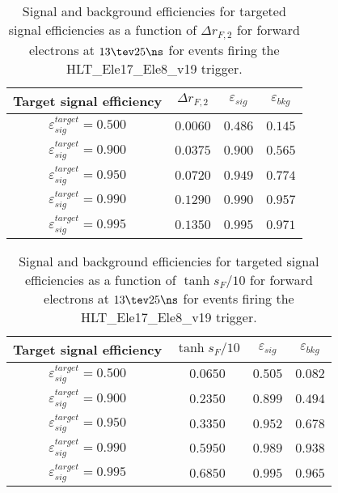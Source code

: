 \clearpage

\begin{table}[!bht]
  \begin{center}
    \begin{tabular}{cccc}
      \hline
      Target signal efficiency & $\Delta r_{F,2}$ & $\varepsilon_{sig}$ & $\varepsilon_{bkg}$ \\ 
      \hline
      $\varepsilon_{sig}^{target} = 0.500$ & $  0.0060$ & $0.486$ & $0.145$ \\
      $\varepsilon_{sig}^{target} = 0.900$ & $  0.0375$ & $0.900$ & $0.565$ \\
      $\varepsilon_{sig}^{target} = 0.950$ & $  0.0720$ & $0.949$ & $0.774$ \\
      $\varepsilon_{sig}^{target} = 0.990$ & $  0.1290$ & $0.990$ & $0.957$ \\
      $\varepsilon_{sig}^{target} = 0.995$ & $  0.1350$ & $0.995$ & $0.971$ \\
      \hline
    \end{tabular}
    \caption{Signal and background efficiencies for targeted signal efficiencies as a function of $\Delta r_{F,2}$ for forward electrons at $13\tev 25\ns$ for events firing the HLT\_Ele17\_Ele8\_v19 trigger.}
    \label{tab:eff_rej_r2F_beam_13_25_trigger_17_8_F}
  \end{center}
\end{table}

\clearpage

\begin{table}[!bht]
  \begin{center}
    \begin{tabular}{cccc}
      \hline
      Target signal efficiency & $\tanh{s_F/10}$ & $\varepsilon_{sig}$ & $\varepsilon_{bkg}$ \\ 
      \hline
      $\varepsilon_{sig}^{target} = 0.500$ & $  0.0650$ & $0.505$ & $0.082$ \\
      $\varepsilon_{sig}^{target} = 0.900$ & $  0.2350$ & $0.899$ & $0.494$ \\
      $\varepsilon_{sig}^{target} = 0.950$ & $  0.3350$ & $0.952$ & $0.678$ \\
      $\varepsilon_{sig}^{target} = 0.990$ & $  0.5950$ & $0.989$ & $0.938$ \\
      $\varepsilon_{sig}^{target} = 0.995$ & $  0.6850$ & $0.995$ & $0.965$ \\
      \hline
    \end{tabular}
    \caption{Signal and background efficiencies for targeted signal efficiencies as a function of $\tanh{s_F/10}$ for forward electrons at $13\tev 25\ns$ for events firing the HLT\_Ele17\_Ele8\_v19 trigger.}
    \label{tab:eff_rej_sF_beam_13_25_trigger_17_8_F}
  \end{center}
\end{table}

